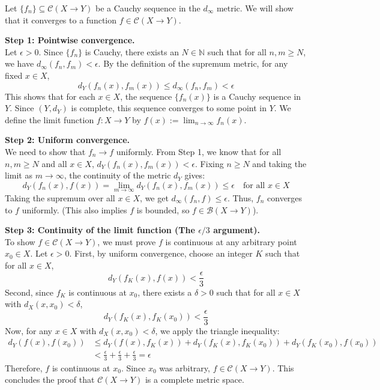 \begin{pfbox}
    Let $\{f_n\} \subseteq \mathcal{C}(X \rightarrow Y)$ be a Cauchy sequence in the $d_\infty$ metric. We will show that it converges to a function $f \in \mathcal{C}(X \rightarrow Y)$.

    \textbf{Step 1: Pointwise convergence.} \\
    Let $\epsilon > 0$. Since $\{f_n\}$ is Cauchy, there exists an $N \in \mathbb{N}$ such that for all $n, m \ge N$, we have $d_\infty(f_n, f_m) < \epsilon$.
    By the definition of the supremum metric, for any fixed $x \in X$,
    $$ d_Y(f_n(x), f_m(x)) \le d_\infty(f_n, f_m) < \epsilon $$
    This shows that for each $x \in X$, the sequence $\{f_n(x)\}$ is a Cauchy sequence in $Y$. Since $(Y, d_Y)$ is complete, this sequence converges to some point in $Y$. We define the limit function $f: X \rightarrow Y$ by $f(x) := \displaystyle\lim_{n \to \infty} f_n(x)$.

    \textbf{Step 2: Uniform convergence.} \\
    We need to show that $f_n \rightarrow f$ uniformly. 
    From Step 1, we know that for all $n, m \ge N$ and all $x \in X$, $d_Y(f_n(x), f_m(x)) < \epsilon$.
    Fixing $n \ge N$ and taking the limit as $m \to \infty$, the continuity of the metric $d_Y$ gives:
    $$ d_Y(f_n(x), f(x)) = \lim_{m \to \infty} d_Y(f_n(x), f_m(x)) \le \epsilon \quad \text{for all } x \in X $$
    Taking the supremum over all $x \in X$, we get $d_\infty(f_n, f) \le \epsilon$. Thus, $f_n$ converges to $f$ uniformly. (This also implies $f$ is bounded, so $f \in \mathcal{B}(X \rightarrow Y)$).

    \textbf{Step 3: Continuity of the limit function (The $\epsilon/3$ argument).} \\
    To show $f \in \mathcal{C}(X \rightarrow Y)$, we must prove $f$ is continuous at any arbitrary point $x_0 \in X$.
    Let $\epsilon > 0$. 
    First, by uniform convergence, choose an integer $K$ such that for all $x \in X$,
    $$ d_Y(f_K(x), f(x)) < \frac{\epsilon}{3} $$
    Second, since $f_K$ is continuous at $x_0$, there exists a $\delta > 0$ such that for all $x \in X$ with $d_X(x, x_0) < \delta$,
    $$ d_Y(f_K(x), f_K(x_0)) < \frac{\epsilon}{3} $$
    Now, for any $x \in X$ with $d_X(x, x_0) < \delta$, we apply the triangle inequality:
    \begin{align*}
        d_Y(f(x), f(x_0)) &\le d_Y(f(x), f_K(x)) + d_Y(f_K(x), f_K(x_0)) + d_Y(f_K(x_0), f(x_0)) \\
        &< \frac{\epsilon}{3} + \frac{\epsilon}{3} + \frac{\epsilon}{3} = \epsilon
    \end{align*}
    Therefore, $f$ is continuous at $x_0$. Since $x_0$ was arbitrary, $f \in \mathcal{C}(X \rightarrow Y)$.
    This concludes the proof that $\mathcal{C}(X \rightarrow Y)$ is a complete metric space.
\end{pfbox}


